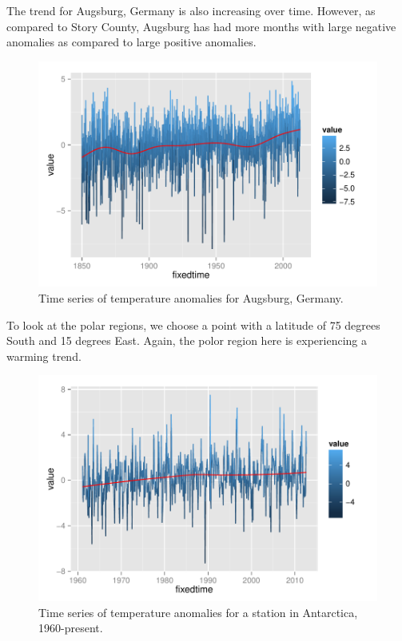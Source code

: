 \documentclass{article}\usepackage{graphicx, color}
\newenvironment{knitrout}{}{} %
\begin{document}
The trend for Augsburg, Germany is also increasing over time. However, as compared to Story County, Augsburg has had more months with large negative anomalies as compared to large positive anomalies.
\begin{figure}[H]
\begin{knitrout}
\color{fgcolor}\includegraphics[width=\linewidth]{figure/augsburg-trend} 
\end{knitrout}

\caption{\label{augsburg}Time series of temperature anomalies for Augsburg, Germany.}
\end{figure}


To look at the polar regions, we choose a point with a latitude of 75 degrees South and 15 degrees East. Again, the polor region here is experiencing a warming trend.

\begin{figure}[H]
\begin{knitrout}
\color{fgcolor}\includegraphics[width=\linewidth]{figure/antartic-trend} 
\end{knitrout}

\caption{\label{antarctica}Time series of temperature anomalies for a station in Antarctica, 1960-present.}
\end{figure}
\end{document}
